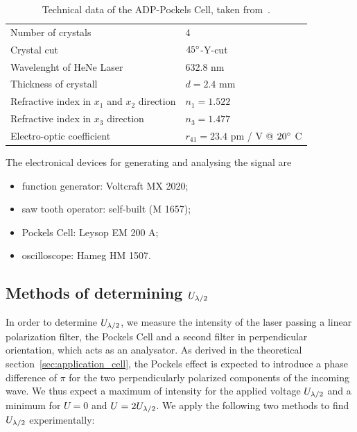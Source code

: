\begin{table}[htdp]
    \begin{tabular}{|p{}|p{}|}
        \hline
        Number of crystals & 4 \\
        Crystal cut & $45^\circ$-Y-cut \\
        Wavelenght of HeNe Laser & 632.8 nm \\
        Thickness of crystall & $d = 2.4$ mm \\
        Refractive index in $x_1$ and $x_2$ direction & $n_1 = 1.522$  \\
        Refractive index in $x_3$ direction & $n_3 = 1.477$  \\
        Electro-optic coefficient & $r_{41} = 23.4$ pm / V @ $ 20^\circ$ C \\
        \hline
    \end{tabular}
\caption{
    Technical data of the ADP-Pockels Cell,
    taken from~\cite{versuchsanleitung}.
    }
\label{tab:pockels_technical}
\end{table}

\begin{samepage}
The electronical devices for generating and analysing the signal are 
\begin{itemize}
    \item
    function generator: Voltcraft MX 2020;
    \item
    saw tooth operator: self-built (M 1657);
    \item
    Pockels Cell: Leysop EM 200 A;
    \item
    oscilloscope: Hameg HM 1507.
\end{itemize}
\end{samepage}


\subsection{Methods of determining $U_{\lambda/2}$}
\label{sec:pdf}
In order to determine $U_{\lambda/2}$, we measure the intensity of the laser 
passing a linear polarization filter, the Pockels Cell and a second filter 
in perpendicular orientation, which acts as an analysator. 
As derived in the theoretical section~\ref{sec:application_cell},
the Pockels effect is expected to introduce a phase difference 
of $\pi$ for the two perpendicularly polarized components of the 
incoming wave. We thus expect a maximum of intensity for the applied 
voltage $U_{\lambda/2}$ and a minimum for $U = 0$ and $U = 2U_{\lambda/2}$. 
We apply the following two methods to find $U_{\lambda/2}$ experimentally:
